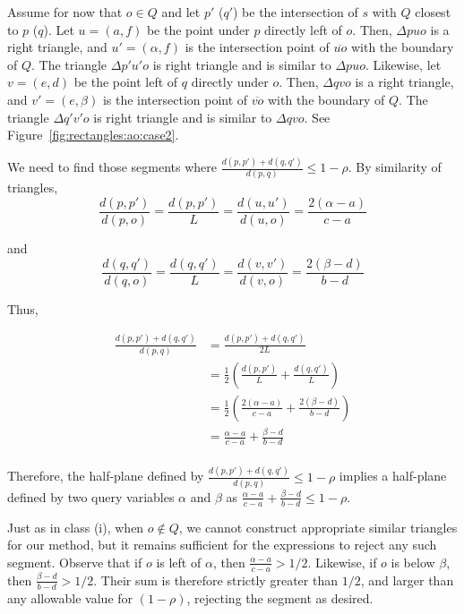 Assume for now that $o \in Q$ and let $p'$ ($q'$) be the intersection of $s$ with $Q$ closest to $p$ ($q$).  Let $u = (a, f)$ be the point under $p$ directly left of $o$. Then, $\Delta p u o$ is a right triangle, and $u' = (\alpha, f)$ is the intersection point of $\overline{u o}$ with the boundary of $Q$.  The triangle $\Delta p' u' o$ is right triangle and is similar to $\Delta p u o$. Likewise, let $v = (e, d)$ be the point left of $q$ directly under $o$. Then, $\Delta q v o$ is a right triangle, and $v' = (e, \beta)$ is the intersection point of $\overline{v o}$ with the boundary of $Q$. The triangle $\Delta q' v' o$ is right triangle and is similar to $\Delta q v o$. See Figure~\ref{fig:rectangles:ao:case2}.

We need to find those segments where $\frac{d(p, p') + d(q, q')}{d(p, q)} \leq 1 - \rho$. By similarity of triangles, 
\[ 
\frac{d(p, p')}{d(p, o)} = \frac{d(p, p')}{L} = \frac{d(u, u')}{d(u, o)} = \frac{2(\alpha - a)}{c - a}
\]

\noindent and 
\[ 
\frac{d(q, q')}{d(q, o)} = \frac{d(q, q')}{L} = \frac{d(v, v')}{d(v, o)} = \frac{2(\beta - d)}{b - d}
\]

\noindent Thus,

\[
\begin{split} 
\frac{d(p, p') + d(q, q')}{d(p, q)}
%
&= \frac{d(p, p') + d(q, q')}{2L} \\
%
&= \frac{1}{2} \left ( \frac{d(p, p')}{L} + \frac{d(q, q')}{L} \right ) \\
%
&= \frac{1}{2} \left ( \frac{2(\alpha - a)}{c - a} + \frac{2(\beta - d)}{b - d} \right ) \\
%
&= \frac{\alpha - a}{c - a} + \frac{\beta - d}{b - d} \\
%
\end{split}
\]

Therefore, the half-plane defined by $\frac{d(p, p') + d(q, q')}{d(p, q)} \leq 1 - \rho$ implies a half-plane defined by two query variables $\alpha$ and $\beta$ as $\frac{\alpha - a}{c - a} + \frac{\beta - d}{b - d} \leq 1 - \rho$.

Just as in class (i), when $o \not \in Q$, we cannot construct appropriate similar triangles for our method, but it remains sufficient for the expressions to reject any such segment. Observe that if $o$ is left of $\alpha$, then $\frac{\alpha - a}{c - a} > 1/2$. Likewise, if $o$ is below $\beta$, then $\frac{\beta - d}{b - d} > 1/2$. Their sum is therefore strictly greater than $1/2$, and larger than any allowable value for $(1 - \rho)$, rejecting the segment as desired.


